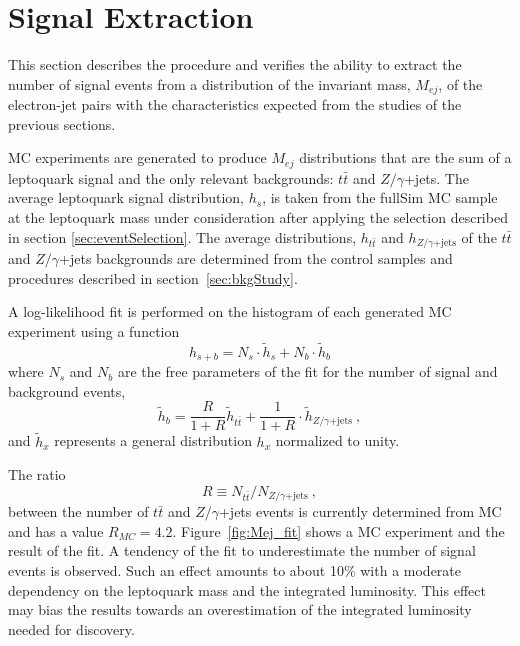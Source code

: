 %


\section{Signal Extraction} \label{sec:signalExtraction}

This section describes the procedure and verifies the ability to extract the 
number of signal events from a distribution of the invariant mass, $M_{ej}$, of the 
electron-jet pairs with the characteristics expected from the studies 
of the previous sections.

MC experiments are generated to produce $M_{ej}$ distributions that are the sum
of a leptoquark signal and the only relevant backgrounds: $t\bar{t}$ and $Z/\gamma$+jets.
The average leptoquark signal distribution, $h_s$, is taken from the fullSim MC 
sample at the leptoquark mass under consideration after applying the selection
described in section \ref{sec:eventSelection}.
The average distributions, $h_{t\bar{t}}$ and $h_{Z/\gamma\mathrm{+jets}}$ 
of the $t\bar{t}$ and $Z/\gamma$+jets backgrounds are determined from the control samples
and procedures described in section~\ref{sec:bkgStudy}.

A log-likelihood fit is performed on the histogram of each generated MC experiment
using a function
\begin{displaymath}
  h_{s+b} = N_s \cdot \tilde{h}_s + N_b \cdot \tilde{h}_b
\end{displaymath}
where $N_s$ and $N_b$ are the free parameters of the fit for the number of signal and background events,
\begin{displaymath}
  \tilde{h}_b = \frac{R}{1+R} \tilde{h}_{t\bar{t}} + \frac{1}{1+R} \cdot \tilde{h}_{Z/\gamma\mathrm{+jets}}~\mathrm{,}
\end{displaymath}
and $\tilde{h}_x$ represents a general distribution $h_x$ normalized to unity. 

The ratio
\begin{displaymath}
  R \equiv N_{t\bar{t}} / N_{Z/\gamma\mathrm{+jets}}~\mathrm{,}
\end{displaymath}
between the number of $t\bar{t}$ and $Z/\gamma$+jets events is currently determined from 
MC and has a value $R_{MC}=4.2$.
Figure~\ref{fig:Mej_fit} shows a MC experiment and the result of the fit.
A tendency of the fit to underestimate the number of signal events is observed. 
Such an effect amounts to about 10\% with a moderate dependency on the leptoquark mass and the 
integrated luminosity. This effect may bias the results towards an overestimation of the integrated
luminosity needed for discovery.

